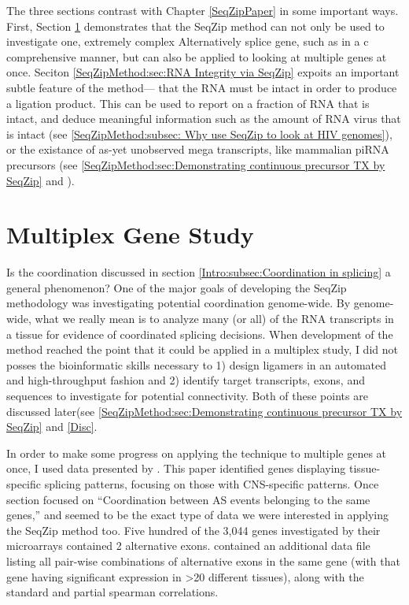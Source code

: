   The three sections contrast with Chapter \ref{SeqZipPaper} in some important ways. First, Section \ref{SeqZipMethod:sec:Multiplex Gene Study} demonstrates that the SeqZip method can not only be used to investigate one, extremely complex Alternatively splice gene, such as \dscam{} in a c comprehensive manner, but can also be applied to looking at multiple genes at once. Seciton \ref{SeqZipMethod:sec:RNA Integrity via SeqZip} expoits an important subtle feature of the method--- that the RNA must be intact in order to produce a ligation product. This can be used to report on a fraction of RNA that is intact, and deduce meaningful information such as the amount of RNA virus that is intact (see \ref{SeqZipMethod:subsec: Why use SeqZip to look at HIV genomes}), or the existance of as-yet unobserved mega transcripts, like mammalian piRNA precursors (see \ref{SeqZipMethod:sec:Demonstrating continuous precursor TX by SeqZip} and \citep{Li2013h,Li2013}).

\section{Multiplex Gene Study}
  \label{SeqZipMethod:sec:Multiplex Gene Study}

  Is the coordination discussed in section \ref{Intro:subsec:Coordination in splicing} a general phenomenon? One of the major goals of developing the SeqZip methodology was investigating potential coordination genome-wide. By genome-wide, what we really mean is to analyze many (or all) of the RNA transcripts in a tissue for evidence of coordinated splicing decisions. When development of the method reached the point that it could be applied in a multiplex study, I did not posses the bioinformatic skills necessary to 1) design ligamers in an automated and high-throughput fashion and 2) identify target transcripts, exons, and sequences to investigate for potential connectivity. Both of these points are discussed later(see \ref{SeqZipMethod:sec:Demonstrating continuous precursor TX by SeqZip} and \ref{Disc}. 

  In order to make some progress on applying the technique to multiple genes at once, I used data presented by \citet{Fagnani2007}. This paper identified genes displaying tissue-specific splicing patterns, focusing on those with CNS-specific patterns. Once section focused on ``Coordination between AS events belonging to the same genes,'' and seemed to be the exact type of data we were interested in applying the SeqZip method too. Five hundred of the 3,044 genes investigated by their microarrays contained 2 alternative exons. \citet{Fagnani2007} contained an additional data file listing all pair-wise combinations of alternative exons in the same gene (with that gene having significant expression in >20 different tissues), along with the standard and partial spearman correlations. 

